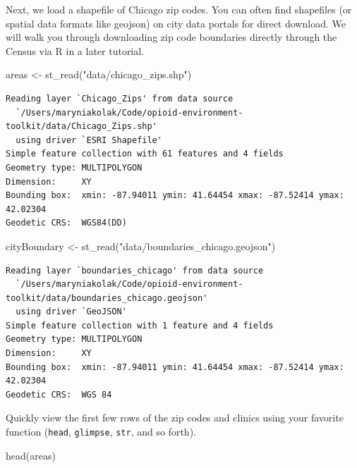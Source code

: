\documentclass[
  letterpaper,
  DIV=11,
  numbers=noendperiod]{scrreprt}
\newenvironment{Shaded}{\begin{snugshade}}{\end{snugshade}}
\newcommand{\FunctionTok}[1]{\textcolor[rgb]{0.28,0.35,0.67}{#1}}
\newcommand{\NormalTok}[1]{\textcolor[rgb]{0.00,0.23,0.31}{#1}}
\newcommand{\OtherTok}[1]{\textcolor[rgb]{0.00,0.23,0.31}{#1}}
\newcommand{\StringTok}[1]{\textcolor[rgb]{0.13,0.47,0.30}{#1}}
\begin{document}
Next, we load a shapefile of Chicago zip codes. You can often find
shapefiles (or spatial data formats like geojson) on city data portals
for direct download. We will walk you through downloading zip code
boundaries directly through the Census via R in a later tutorial.

\begin{Shaded}
\begin{Highlighting}[]
\NormalTok{areas }\OtherTok{\textless{}{-}} \FunctionTok{st\_read}\NormalTok{(}\StringTok{"data/chicago\_zips.shp"}\NormalTok{)}
\end{Highlighting}
\end{Shaded}

\begin{verbatim}
Reading layer `Chicago_Zips' from data source 
  `/Users/maryniakolak/Code/opioid-environment-toolkit/data/Chicago_Zips.shp' 
  using driver `ESRI Shapefile'
Simple feature collection with 61 features and 4 fields
Geometry type: MULTIPOLYGON
Dimension:     XY
Bounding box:  xmin: -87.94011 ymin: 41.64454 xmax: -87.52414 ymax: 42.02304
Geodetic CRS:  WGS84(DD)
\end{verbatim}

\begin{Shaded}
\begin{Highlighting}[]
\NormalTok{cityBoundary }\OtherTok{\textless{}{-}} \FunctionTok{st\_read}\NormalTok{(}\StringTok{"data/boundaries\_chicago.geojson"}\NormalTok{)}
\end{Highlighting}
\end{Shaded}

\begin{verbatim}
Reading layer `boundaries_chicago' from data source 
  `/Users/maryniakolak/Code/opioid-environment-toolkit/data/boundaries_chicago.geojson' 
  using driver `GeoJSON'
Simple feature collection with 1 feature and 4 fields
Geometry type: MULTIPOLYGON
Dimension:     XY
Bounding box:  xmin: -87.94011 ymin: 41.64454 xmax: -87.52414 ymax: 42.02304
Geodetic CRS:  WGS 84
\end{verbatim}

Quickly view the first few rows of the zip codes and clinics using your
favorite function (\texttt{head}, \texttt{glimpse}, \texttt{str}, and so
forth).

\begin{Shaded}
\begin{Highlighting}[]
\FunctionTok{head}\NormalTok{(areas)}
\end{Highlighting}
\end{Shaded}
\end{document}
